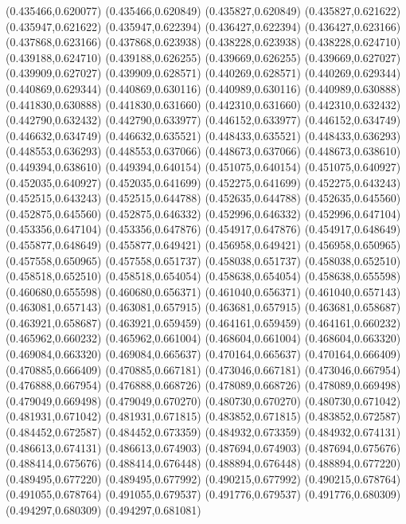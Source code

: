 (0.435466,0.620077)
(0.435466,0.620849)
(0.435827,0.620849)
(0.435827,0.621622)
(0.435947,0.621622)
(0.435947,0.622394)
(0.436427,0.622394)
(0.436427,0.623166)
(0.437868,0.623166)
(0.437868,0.623938)
(0.438228,0.623938)
(0.438228,0.624710)
(0.439188,0.624710)
(0.439188,0.626255)
(0.439669,0.626255)
(0.439669,0.627027)
(0.439909,0.627027)
(0.439909,0.628571)
(0.440269,0.628571)
(0.440269,0.629344)
(0.440869,0.629344)
(0.440869,0.630116)
(0.440989,0.630116)
(0.440989,0.630888)
(0.441830,0.630888)
(0.441830,0.631660)
(0.442310,0.631660)
(0.442310,0.632432)
(0.442790,0.632432)
(0.442790,0.633977)
(0.446152,0.633977)
(0.446152,0.634749)
(0.446632,0.634749)
(0.446632,0.635521)
(0.448433,0.635521)
(0.448433,0.636293)
(0.448553,0.636293)
(0.448553,0.637066)
(0.448673,0.637066)
(0.448673,0.638610)
(0.449394,0.638610)
(0.449394,0.640154)
(0.451075,0.640154)
(0.451075,0.640927)
(0.452035,0.640927)
(0.452035,0.641699)
(0.452275,0.641699)
(0.452275,0.643243)
(0.452515,0.643243)
(0.452515,0.644788)
(0.452635,0.644788)
(0.452635,0.645560)
(0.452875,0.645560)
(0.452875,0.646332)
(0.452996,0.646332)
(0.452996,0.647104)
(0.453356,0.647104)
(0.453356,0.647876)
(0.454917,0.647876)
(0.454917,0.648649)
(0.455877,0.648649)
(0.455877,0.649421)
(0.456958,0.649421)
(0.456958,0.650965)
(0.457558,0.650965)
(0.457558,0.651737)
(0.458038,0.651737)
(0.458038,0.652510)
(0.458518,0.652510)
(0.458518,0.654054)
(0.458638,0.654054)
(0.458638,0.655598)
(0.460680,0.655598)
(0.460680,0.656371)
(0.461040,0.656371)
(0.461040,0.657143)
(0.463081,0.657143)
(0.463081,0.657915)
(0.463681,0.657915)
(0.463681,0.658687)
(0.463921,0.658687)
(0.463921,0.659459)
(0.464161,0.659459)
(0.464161,0.660232)
(0.465962,0.660232)
(0.465962,0.661004)
(0.468604,0.661004)
(0.468604,0.663320)
(0.469084,0.663320)
(0.469084,0.665637)
(0.470164,0.665637)
(0.470164,0.666409)
(0.470885,0.666409)
(0.470885,0.667181)
(0.473046,0.667181)
(0.473046,0.667954)
(0.476888,0.667954)
(0.476888,0.668726)
(0.478089,0.668726)
(0.478089,0.669498)
(0.479049,0.669498)
(0.479049,0.670270)
(0.480730,0.670270)
(0.480730,0.671042)
(0.481931,0.671042)
(0.481931,0.671815)
(0.483852,0.671815)
(0.483852,0.672587)
(0.484452,0.672587)
(0.484452,0.673359)
(0.484932,0.673359)
(0.484932,0.674131)
(0.486613,0.674131)
(0.486613,0.674903)
(0.487694,0.674903)
(0.487694,0.675676)
(0.488414,0.675676)
(0.488414,0.676448)
(0.488894,0.676448)
(0.488894,0.677220)
(0.489495,0.677220)
(0.489495,0.677992)
(0.490215,0.677992)
(0.490215,0.678764)
(0.491055,0.678764)
(0.491055,0.679537)
(0.491776,0.679537)
(0.491776,0.680309)
(0.494297,0.680309)
(0.494297,0.681081)

